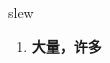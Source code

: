 
\begin{frame}
{\huge slew}
\begin{center}
\begin{enumerate}\Large
  \item \textbf{大量，许多}
\end{enumerate}
\end{center}
\end{frame}
